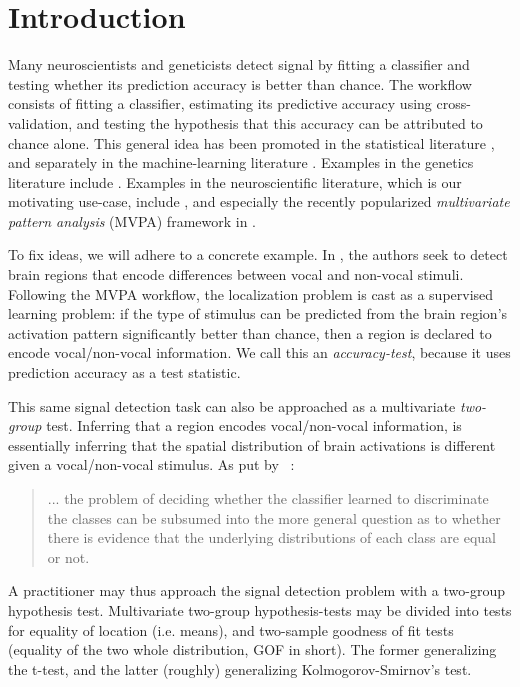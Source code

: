 \documentclass[]{bio}
\begin{document}
\section{Introduction}
\label{sec:introduction}

Many neuroscientists and geneticists detect signal by fitting a classifier and testing whether its prediction accuracy is better than chance. 
The workflow consists of fitting a classifier, estimating its predictive accuracy using cross-validation, and testing the hypothesis that this accuracy can be attributed to chance alone. 
This general idea has been promoted in the statistical literature \citep{friedman2003multivariate}, and separately in the machine-learning literature \citep{eric2008testing,ojala_permutation_2010,lopez2016revisiting}.
Examples in the genetics literature include \cite{golub_molecular_1999,slonim_class_2000,radmacher_paradigm_2002,mukherjee_estimating_2003,juan_prediction_2004,jiang_calculating_2008,yu2007two}.
Examples in the neuroscientific literature, which is our motivating use-case, include \cite{golland_permutation_2003,pereira_machine_2009,schreiber2013statistical,olivetti2013kernel,varoquaux_assessing_2016}, and especially the recently popularized \emph{multivariate pattern analysis} (MVPA) framework in \cite{kriegeskorte_information-based_2006}.

To fix ideas, we will adhere to a concrete example.
In \cite{gilron_quantifying_2016}, the authors seek to detect brain regions that encode differences between vocal and non-vocal stimuli. 
Following the MVPA workflow, the localization problem is cast as a supervised learning problem: if the type of stimulus can be predicted from the brain region's activation pattern significantly better than chance, then a region is declared to encode vocal/non-vocal information. 
We call this an \emph{accuracy-test}, because it uses prediction accuracy as a test statistic. 

This same signal detection task can also be approached as a multivariate \emph{two-group} test.
Inferring that a region encodes vocal/non-vocal information, is essentially inferring that the spatial distribution of brain activations is different given a vocal/non-vocal stimulus. 
As put by ~\cite{pereira_machine_2009}: 
\begin{quote}
	... the problem of deciding whether the classifier learned to discriminate the classes can be subsumed into the more general question as to whether there is evidence that the underlying distributions of each class are equal or not.
\end{quote}
A practitioner may thus approach the signal detection problem with a two-group hypothesis test.
Multivariate two-group hypothesis-tests may be divided into tests for equality of location (i.e. means), and two-sample goodness of fit tests (equality of the two whole distribution, GOF in short).
The former generalizing the t-test, and the latter (roughly) generalizing Kolmogorov-Smirnov's test.
\end{document}
